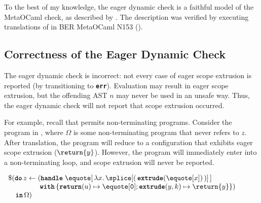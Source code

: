 To the best of my knowledge, the eager dynamic check is a faithful model of the MetaOCaml check, as described by \citet{kiselyov-24}. The description was verified by executing translations of  in BER MetaOCaml N153 (). 

\subsection{Correctness of the Eager Dynamic Check}\label{subsection:eager-dynamic-correctness}
The eager dynamic check is incorrect: not every case of eager scope extrusion is reported (by transitioning to \textbf{\texttt{err}}). Evaluation may result in eager scope extrusion, but the offending AST $n$ may never be used in an unsafe way. Thus, the eager dynamic check will not report that scope extrusion occurred. 

For example, recall that \sourceLang{} permits non-terminating programs. Consider the \sourceLang{} program in , where $\Omega$ is some non-terminating program that never refers to $z$. After translation, the program will reduce to a configuration that exhibits eager scope extrusion ($\return{y}$). However, the program will immediately enter into a non-terminating loop, and scope extrusion will never be reported.

\begin{code} 
 \begin{source}
  $\begin{array}{l}
      \$(\textbf{\texttt{do}} \, z \leftarrow (\textbf{\texttt{handle}} \; \equote[\, {\lambda x. \,\splice[(\,{{\textbf{\texttt{extrude}}(\equote[x])}}\,)]} \,] \\
      \quad\quad\quad\quad\,\; \textbf{\texttt{with}} \, \{ \textbf{\texttt{return}}(u) \mapsto {\equote[\texttt{0}]}; \textbf{\texttt{extrude}}(y, k) \mapsto {\return{y}}\})\\
      \quad \textbf{\texttt{in}} \, \Omega)
    \end{array}$
 \end{source}
 \label{listing:eager-scope-extrusion-unsafe}
\end{code}


